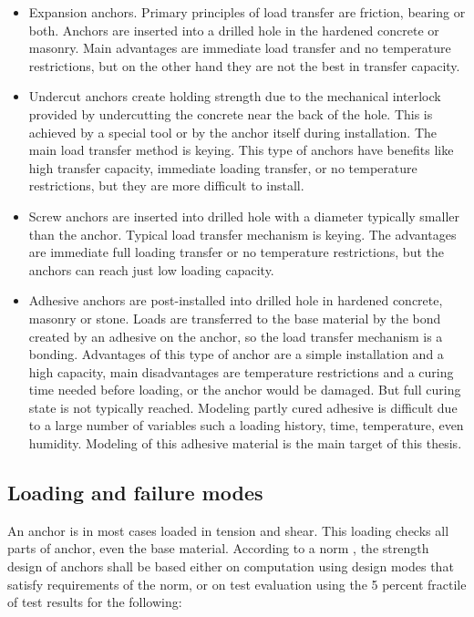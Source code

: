 	\begin{itemize}

	\item Expansion anchors. Primary principles of load transfer are friction, bearing or both. Anchors are inserted into a drilled hole in the hardened concrete or masonry. Main advantages are immediate load transfer and no temperature restrictions, but on the other hand they are not the best in transfer capacity. 

	\item Undercut anchors create holding strength due to the mechanical interlock provided by undercutting the concrete near the back of the hole. This is achieved by a special tool or by the anchor itself during installation. The main load transfer method is keying. This type of anchors have benefits like high transfer capacity, immediate loading transfer, or no temperature restrictions, but they are more difficult to install. 

	\item Screw anchors are inserted into drilled hole with a diameter typically smaller than the anchor. Typical load transfer mechanism is keying. The advantages are immediate full loading transfer or no temperature restrictions, but the anchors can reach just low loading capacity.

	\item Adhesive anchors are post-installed into drilled hole in hardened concrete, masonry or stone. Loads are transferred to the base material by the bond created by an adhesive on the anchor, so the load transfer mechanism is a bonding. Advantages of this type of anchor are a simple installation and a high capacity, main disadvantages are temperature restrictions and a curing time needed before loading, or the anchor would be damaged. But full curing state is not typically reached. Modeling partly cured adhesive is difficult due to a large number of variables such a loading history, time, temperature, even humidity. Modeling of this adhesive material is the main target of this thesis.
\end{itemize} 

\subsection{Loading and failure modes}
An anchor is in most cases loaded in tension and shear. This loading checks all parts of anchor, even the base material. According to a norm \cite{anchors-ACI-318M}, the strength design of anchors shall be based either on computation using design modes that satisfy requirements of the norm, or on test evaluation using the 5 percent fractile of test results for the following:

